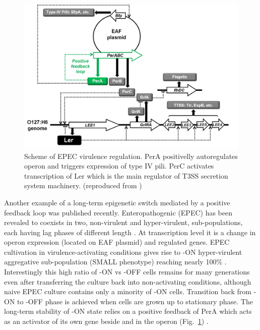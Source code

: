 \begin{figure}[h!]
  \centering
  \includegraphics[scale=0.2]{text/Pictures/perOperonRegulation.jpg}
	\caption{Scheme of EPEC virulence regulation. PerA positivelly autoregulates  operon and triggers expression of type IV pili. PerC activates transcription of Ler which is the main regulator of T3SS secretion system machinery. (reproduced from \cite{ronin2017long})}
	\label{per}
\end{figure}

Another example of a long-term epigenetic switch mediated by a positive feedback loop was published recently.
Enteropathogenic  (EPEC) has been revealed to coexists in two, non-virulent and hyper-virulent, sub-populations, each having lag phases of different length \cite{ronin2017long}.
At transcription level it is a change in  operon expression (located on EAF plasmid) and  regulated genes.
EPEC cultivation in virulence-activating conditions gives rise to -ON hyper-virulent aggregative sub-population (SMALL phenotype) reaching nearly 100\% \cite{ronin2017long}.
Interestingly this high ratio of -ON vs -OFF cells remains for many generations even after transferring the culture back into non-activating conditions, although naive EPEC culture contains only a minority of -ON cells.
Transition back from -ON to -OFF phase is achieved when cells are grown up to stationary phase.
The long-term stability of -ON state relies on a positive feedback of PerA which acts as an activator of its own gene beside  and  in the  operon (Fig.~\ref{per}) \cite{ibarra2003identification, ronin2017long}.

